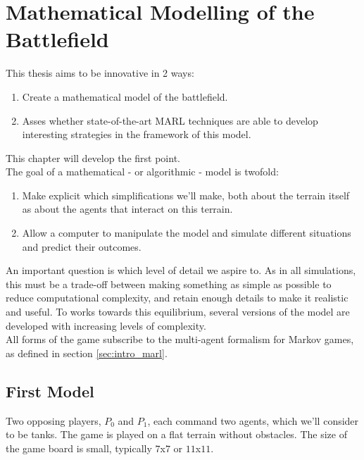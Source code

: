 \chapter{Mathematical Modelling of the Battlefield}
\label{ch:modelling}
This thesis aims to be innovative in 2 ways:
\begin{enumerate}
    \item Create a mathematical model of the battlefield.
     \item Asses whether state-of-the-art MARL techniques are able to develop interesting strategies in the framework of this model.
\end{enumerate}
This chapter will develop the first point.\\
The goal of a mathematical - or algorithmic - model is twofold:
\begin{enumerate}
    \item Make explicit which simplifications we'll make, both about the terrain itself as about the agents that interact on this terrain.
    \item Allow a computer to manipulate the model and simulate different situations and predict their outcomes.
\end{enumerate}
An important question is which level of detail we aspire to. As in all simulations, this must be a trade-off between making something as simple as possible to reduce computational complexity, and retain enough details to make it realistic and useful. To works towards this equilibrium, several versions of the model are developed with increasing levels of complexity.\\

All forms of the game subscribe to the multi-agent formalism for Markov games, as defined in section \ref{sec:intro_marl}.

\section{First Model}
\label{sec:first_model}
Two opposing players, $P_0$ and $P_1$, each command two agents, which we'll consider to be tanks. The game is played on a flat terrain without obstacles. The  size of the game board is small, typically $7$x$7$ or $11$x$11$.\\

